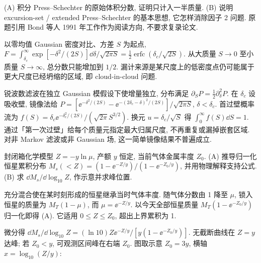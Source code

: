 \begin{exercise}
(A) 积分 Press--Schechter 的原始体积分数, 证明只计入一半质量.
(B) 说明 excursion-set / extended Press--Schechter 的基本思想, 它怎样消除因子 2 问题. 原题引用 Bond 等人 1991 年工作作为阅读方向, 不要求复录论文.
\end{exercise}
\begin{solution}
以零均值 Gaussian 密度对比、方差 $S$ 为起点, $F=\int_{\delta_c}^\infty\exp[-\delta^2/(2S)]\dd\delta/\sqrt{2\pi S}=\frac12\operatorname{erfc}(\delta_c/\sqrt{2S})$. 从大质量 $S\to0$ 至小质量 $S\to\infty$, 总分数只能增加到 $1/2$. 漏计来源是某尺度上的低密度点仍可能属于更大尺度已经坍缩的区域, 即 cloud-in-cloud 问题.

锐波数滤波在独立 Gaussian 模假设下使增量独立, 分布满足 $\partial_SP=\frac12\partial_\delta^2P$. 在 $\delta_c$ 设吸收壁, 镜像法给 $P=[\ee^{-\delta^2/(2S)}-\ee^{-(2\delta_c-\delta)^2/(2S)}]/\sqrt{2\pi S}$, $\delta<\delta_c$. 首过壁概率流为 $f(S)=\delta_c\ee^{-\delta_c^2/(2S)}/(\sqrt{2\pi}S^{3/2})$. 换元 $u=\delta_c/\sqrt S$ 得 $\int_0^\infty f(S)\dd S=1$. 通过「第一次过壁」给每个质量元指定最大归属尺度, 不再重复或漏掉嵌套区域. 对非 Markov 滤波或非 Gaussian 场, 这一简单镜像结果不普遍成立.
\end{solution}

\begin{exercise}
封闭箱化学模型 $Z=-y\ln\mu$, 产额 $y$ 恒定, 当前气体金属丰度 $Z_0$.
(A) 推导归一化恒星累积分布 $M_s(<Z)=(1-\ee^{-Z/y})/(1-\ee^{-Z_0/y})$, 并用物理解释支持公式.
(B) 求 $\dd M_s/\dd\log_{10}Z$, 作示意并求峰位置.
\end{exercise}
\begin{solution}
充分混合使在某时刻形成的恒星继承当时气体丰度. 随气体分数由 1 降至 $\mu$, 锁入恒星的质量为 $M_T(1-\mu)$, 而 $\mu=\ee^{-Z/y}$. 以今天全部恒星质量 $M_T(1-\ee^{-Z_0/y})$ 归一化即得 (A). 它适用 $0\le Z\le Z_0$, 超出上界累积为 1.

微分得 $\dd M_s/\dd\log_{10}Z=(\ln10)Z\ee^{-Z/y}/[y(1-\ee^{-Z_0/y})]$. 无截断曲线在 $Z=y$ 达峰; 若 $Z_0<y$, 可观测区间峰在右端 $Z_0$. 图取示意 $Z_0=3y$, 横轴 $x=\log_{10}(Z/y)$:
\begin{center}\end{center}
\end{solution}

